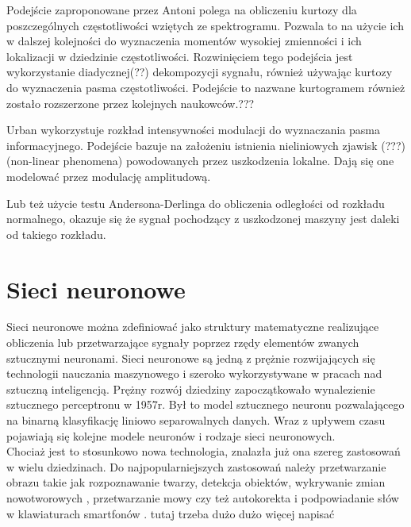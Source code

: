 \documentclass[inzynierska]{pwr_wmat_praca_dyplomowa}
\theoremstyle{plain}
\numberwithin{theorem}{chapter}
\theoremstyle{definition}
\numberwithin{theorem}{chapter}
\begin{document}
Podejście zaproponowane przez Antoni \cite{antoni} polega na obliczeniu kurtozy dla poszczególnych częstotliwości wziętych ze spektrogramu. Pozwala to na użycie ich w dalszej kolejności do wyznaczenia momentów wysokiej zmienności i ich lokalizacji w dziedzinie częstotliwości. Rozwinięciem tego podejścia jest wykorzystanie diadycznej(??) dekompozycji sygnału, również używając kurtozy do wyznaczenia pasma częstotliwości. Podejście to nazwane kurtogramem również zostało rozszerzone przez kolejnych naukowców.???\cite{antoni2}

Urban \cite{urban} wykorzystuje rozkład intensywności modulacji do wyznaczania pasma informacyjnego. Podejście bazuje na założeniu istnienia nieliniowych zjawisk (???) (non-linear phenomena) powodowanych przez uszkodzenia lokalne. Dają się one modelować przez modulację amplitudową. 

Lub też użycie testu Andersona-Derlinga do obliczenia odległości od rozkładu normalnego, okazuje się że sygnał pochodzący z uszkodzonej maszyny jest daleki od takiego rozkładu. \cite{wylomanska} 


\section{Sieci neuronowe}
Sieci neuronowe można zdefiniować jako struktury matematyczne realizujące obliczenia lub przetwarzające sygnały poprzez rzędy elementów zwanych sztucznymi neuronami.
Sieci neuronowe są jedną z prężnie rozwijających się technologii nauczania maszynowego i szeroko wykorzystywane w pracach nad sztuczną inteligencją.
Prężny rozwój dziedziny zapoczątkowało wynalezienie sztucznego perceptronu w 1957r. Był to model sztucznego neuronu pozwalającego na binarną klasyfikację liniowo separowalnych danych. Wraz z upływem czasu pojawiają się kolejne modele neuronów i rodzaje sieci neuronowych. 
\\
Chociaż jest to stosunkowo nowa technologia, znalazła już ona szereg zastosowań w wielu dziedzinach. Do najpopularniejszych zastosowań należy przetwarzanie obrazu takie jak rozpoznawanie twarzy, detekcja obiektów, wykrywanie zmian nowotworowych \cite{nnnature}, przetwarzanie mowy \cite{nnspeech} czy też autokorekta i podpowiadanie słów w klawiaturach smartfonów \cite{nngboard}.
{\Huge  tutaj trzeba dużo dużo więcej napisać }


\end{document}
